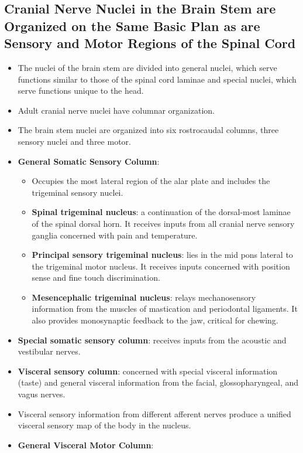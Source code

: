 \documentclass[12pt,a4paper]{article}
\begin{document}
\subsection{Cranial Nerve Nuclei in the Brain Stem are Organized on the Same Basic Plan as are Sensory and Motor Regions of the Spinal Cord}
\begin{itemize}
    \item The nuclei of the brain stem are divided into general nuclei, which serve functions similar to those of the spinal cord laminae and special nuclei, which serve functions unique to the head.
    \item Adult cranial nerve nuclei have columnar organization.
    \item The brain stem nuclei are organized into six rostrocaudal columns, three sensory nuclei and three motor.
    \item \textbf{General Somatic Sensory Column}:
        \begin{itemize}
            \item Occupies the most lateral region of the alar plate and includes the trigeminal sensory nuclei.
            \item \textbf{Spinal trigeminal nucleus}: a continuation of the dorsal-most laminae of the spinal dorsal horn. It receives inputs from all cranial nerve sensory ganglia concerned with pain and temperature. 
            \item \textbf{Principal sensory trigeminal nucleus}: lies in the mid pons lateral to the trigeminal motor nucleus. It receives inputs concerned with position sense and fine touch discrimination. 
            \item \textbf{Mesencephalic trigeminal nucleus}: relays mechanosensory information from the muscles of mastication and periodontal ligaments. It also provides monosynaptic feedback to the jaw, critical for chewing.
        \end{itemize}
    \item \textbf{Special somatic sensory column}: receives inputs from the acoustic and vestibular nerves. 
    \item \textbf{Visceral sensory column}: concerned with special visceral information (taste) and general visceral information from the facial, glossopharyngeal, and vagus nerves. 
    \item Visceral sensory information from different afferent nerves produce a unified visceral sensory map of the body in the nucleus.
    \item \textbf{General Visceral Motor Column}:

\end{itemize}
\end{document}
